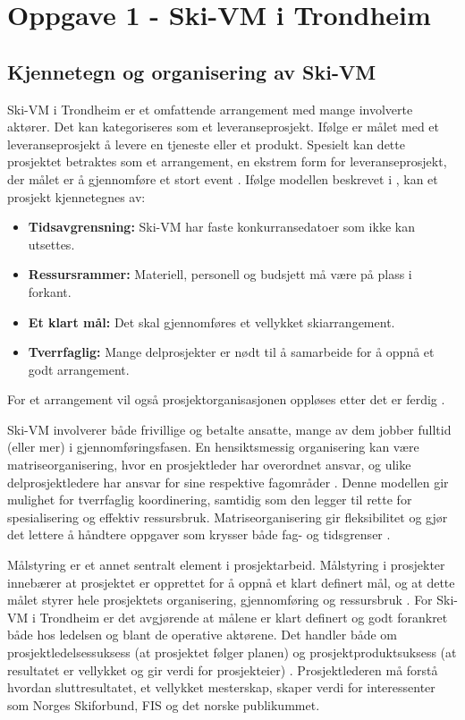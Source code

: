 \section{Oppgave 1 - Ski-VM i Trondheim}
\subsection{Kjennetegn og organisering av Ski-VM}
Ski-VM i Trondheim er et omfattende arrangement med mange involverte aktører. Det kan kategoriseres som et leveranseprosjekt. Ifølge \parencite[][s.165]{Teknologiledelse} er målet med et leveranseprosjekt å levere en tjeneste eller et produkt. Spesielt kan dette prosjektet betraktes som et arrangement, en ekstrem form for leveranseprosjekt, der målet er å gjennomføre et stort event \parencite[][s.165]{Teknologiledelse}. Ifølge modellen beskrevet i \parencite[][s.164]{Teknologiledelse}, kan et prosjekt kjennetegnes av:
\begin{itemize}
    \item \textbf{Tidsavgrensning:} Ski-VM har faste konkurransedatoer som ikke kan utsettes.
    \item \textbf{Ressursrammer:} Materiell, personell og budsjett må være på plass i forkant.
    \item \textbf{Et klart mål:} Det skal gjennomføres et vellykket skiarrangement.
    \item \textbf{Tverrfaglig:} Mange delprosjekter er nødt til å samarbeide for å oppnå et godt arrangement.
\end{itemize}
For et arrangement vil også prosjektorganisasjonen oppløses etter det er ferdig \parencite[][s.165]{Teknologiledelse}.  

Ski-VM involverer både frivillige og betalte ansatte, mange av dem jobber fulltid (eller mer) i gjennomføringsfasen. En hensiktsmessig organisering kan være matriseorganisering, hvor en prosjektleder har overordnet ansvar, og ulike delprosjektledere har ansvar for sine respektive fagområder \parencite[][s.166]{Teknologiledelse}. Denne modellen gir mulighet for tverrfaglig koordinering, samtidig som den legger til rette for spesialisering og effektiv ressursbruk. Matriseorganisering gir fleksibilitet og gjør det lettere å håndtere oppgaver som krysser både fag- og tidsgrenser \parencite[][s.166]{Teknologiledelse}.

Målstyring er et annet sentralt element i prosjektarbeid. Målstyring i prosjekter innebærer at prosjektet er opprettet for å oppnå et klart definert mål, og at dette målet styrer hele prosjektets organisering, gjennomføring og ressursbruk \parencite[][s.164]{Teknologiledelse}. For Ski-VM i Trondheim er det avgjørende at målene er klart definert og godt forankret både hos ledelsen og blant de operative aktørene. Det handler både om prosjektledelsessuksess (at prosjektet følger planen) og prosjektproduktsuksess (at resultatet er vellykket og gir verdi for prosjekteier) \parencite[][s.165]{Teknologiledelse}. Prosjektlederen må forstå hvordan sluttresultatet, et vellykket mesterskap, skaper verdi for interessenter som Norges Skiforbund, FIS og det norske publikummet.

